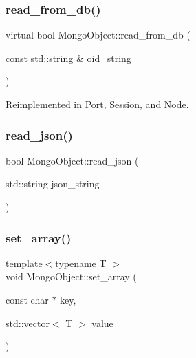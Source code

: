 \mbox{\label{class_mongo_object_a729412e226c9964e13ba80688c3f5e00}} 
\subsubsection{\texorpdfstring{read\+\_\+from\+\_\+db()}{read\_from\_db()}\hspace{0.1cm}{\footnotesize\ttfamily [2/2]}}
{\footnotesize\ttfamily virtual bool Mongo\+Object\+::read\+\_\+from\+\_\+db (\begin{DoxyParamCaption}\item[{const std\+::string \&}]{oid\+\_\+string }\end{DoxyParamCaption})\hspace{0.3cm}{\ttfamily [virtual]}}



Reimplemented in \hyperlink{class_port_a952b0b030c884147a36be7a04eb22183}{Port}, \hyperlink{class_session_a4f09644fd155a1d5640cedefe4aa42fc}{Session}, and \hyperlink{class_node_a60c605aced4420d3d6f6fe54b5a5b6bb}{Node}.

\mbox{\label{class_mongo_object_adce8ffc4811a9d1c94701711f574bc34}} 
\subsubsection{\texorpdfstring{read\+\_\+json()}{read\_json()}}
{\footnotesize\ttfamily bool Mongo\+Object\+::read\+\_\+json (\begin{DoxyParamCaption}\item[{std\+::string}]{json\+\_\+string }\end{DoxyParamCaption})}

\mbox{\label{class_mongo_object_ac251f38eef739fb9e1418a20e7fcc7f7}} 
\subsubsection{\texorpdfstring{set\+\_\+array()}{set\_array()}}
{\footnotesize\ttfamily template$<$typename T $>$ \\
void Mongo\+Object\+::set\+\_\+array (\begin{DoxyParamCaption}\item[{const char $\ast$}]{key,  }\item[{std\+::vector$<$ T $>$}]{value }\end{DoxyParamCaption})\hspace{0.3cm}{\ttfamily [inline]}}

